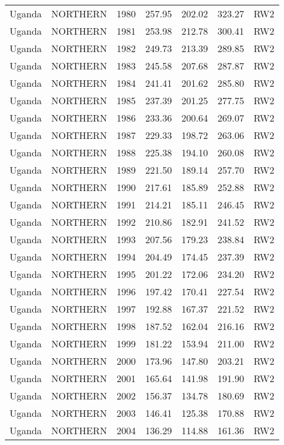 \begin{longtable}{lllrrrl}
  Uganda & NORTHERN & 1980 & 257.95 & 202.02 & 323.27 & RW2 \\ 
  Uganda & NORTHERN & 1981 & 253.98 & 212.78 & 300.41 & RW2 \\ 
  Uganda & NORTHERN & 1982 & 249.73 & 213.39 & 289.85 & RW2 \\ 
  Uganda & NORTHERN & 1983 & 245.58 & 207.68 & 287.87 & RW2 \\ 
  Uganda & NORTHERN & 1984 & 241.41 & 201.62 & 285.80 & RW2 \\ 
  Uganda & NORTHERN & 1985 & 237.39 & 201.25 & 277.75 & RW2 \\ 
  Uganda & NORTHERN & 1986 & 233.36 & 200.64 & 269.07 & RW2 \\ 
  Uganda & NORTHERN & 1987 & 229.33 & 198.72 & 263.06 & RW2 \\ 
  Uganda & NORTHERN & 1988 & 225.38 & 194.10 & 260.08 & RW2 \\ 
  Uganda & NORTHERN & 1989 & 221.50 & 189.14 & 257.70 & RW2 \\ 
  Uganda & NORTHERN & 1990 & 217.61 & 185.89 & 252.88 & RW2 \\ 
  Uganda & NORTHERN & 1991 & 214.21 & 185.11 & 246.45 & RW2 \\ 
  Uganda & NORTHERN & 1992 & 210.86 & 182.91 & 241.52 & RW2 \\ 
  Uganda & NORTHERN & 1993 & 207.56 & 179.23 & 238.84 & RW2 \\ 
  Uganda & NORTHERN & 1994 & 204.49 & 174.45 & 237.39 & RW2 \\ 
  Uganda & NORTHERN & 1995 & 201.22 & 172.06 & 234.20 & RW2 \\ 
  Uganda & NORTHERN & 1996 & 197.42 & 170.41 & 227.54 & RW2 \\ 
  Uganda & NORTHERN & 1997 & 192.88 & 167.37 & 221.52 & RW2 \\ 
  Uganda & NORTHERN & 1998 & 187.52 & 162.04 & 216.16 & RW2 \\ 
  Uganda & NORTHERN & 1999 & 181.22 & 153.94 & 211.00 & RW2 \\ 
  Uganda & NORTHERN & 2000 & 173.96 & 147.80 & 203.21 & RW2 \\ 
  Uganda & NORTHERN & 2001 & 165.64 & 141.98 & 191.90 & RW2 \\ 
  Uganda & NORTHERN & 2002 & 156.37 & 134.78 & 180.69 & RW2 \\ 
  Uganda & NORTHERN & 2003 & 146.41 & 125.38 & 170.88 & RW2 \\ 
  Uganda & NORTHERN & 2004 & 136.29 & 114.88 & 161.36 & RW2 \\ 

\end{longtable}
